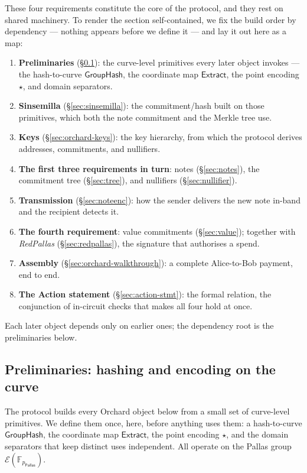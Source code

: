 \documentclass[11pt,a4paper]{article}
\theoremstyle{definition}
\newcommand{\F}{\mathbb{F}}
\newcommand{\Pallas}{\ensuremath{\mathsf{Pallas}}}
\newcommand{\Ep}{\ensuremath{\mathcal{E}}}
\newcommand{\Extract}{\ensuremath{\mathsf{Extract}}}
\newcommand{\GroupHash}{\ensuremath{\mathsf{GroupHash}}}
\begin{document}
These four requirements constitute the core of the protocol, and they rest on shared
machinery. To render the section self-contained, we fix the build
order by dependency --- nothing appears before we define it --- and lay it
out here as a map:
\begin{enumerate}[leftmargin=*]
\item \textbf{Preliminaries} (\S\ref{sec:prelim-curve}): the curve-level
primitives every later object invokes --- the hash-to-curve $\GroupHash$, the
coordinate map $\Extract$, the point encoding $\star$, and domain
separators.
\item \textbf{Sinsemilla} (\S\ref{sec:sinsemilla}): the commitment/hash
built on those primitives, which both the note commitment and the Merkle
tree use.
\item \textbf{Keys} (\S\ref{sec:orchard-keys}): the key hierarchy, from
which the protocol derives addresses, commitments, and nullifiers.
\item \textbf{The first three requirements in turn}: notes
(\S\ref{sec:notes}), the commitment tree (\S\ref{sec:tree}), and nullifiers
(\S\ref{sec:nullifier}).
\item \textbf{Transmission} (\S\ref{sec:noteenc}): how the sender delivers
the new note in-band and the recipient detects it.
\item \textbf{The fourth requirement}: value commitments
(\S\ref{sec:value}); together with \emph{RedPallas}
(\S\ref{sec:redpallas}), the signature that authorises a spend.
\item \textbf{Assembly} (\S\ref{sec:orchard-walkthrough}): a complete Alice-to-Bob
payment, end to end.
\item \textbf{The Action statement} (\S\ref{sec:action-stmt}): the formal
relation, the conjunction of in-circuit checks that makes all four hold at
once.
\end{enumerate}
Each later object depends only on earlier ones; the dependency root is the
preliminaries below.

\subsection{Preliminaries: hashing and encoding on the curve}\label{sec:prelim-curve}

The protocol builds every Orchard object below from a small set of curve-level
primitives. We define them once, here, before anything uses them: a
hash-to-curve $\GroupHash$, the coordinate map $\Extract$, the point
encoding $\star$, and the domain separators that keep distinct uses
independent. All operate on the Pallas group $\Ep(\F_{p_{\Pallas}})$.
\end{document}
